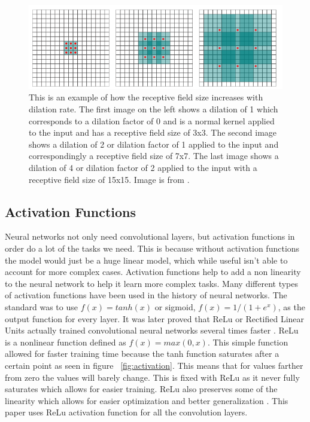 \begin{figure}[tbh]
\centering
\includegraphics[width=\textwidth]{dilated_convolutions.png}
\caption{This is an example of how the receptive field size increases with dilation rate. The first image on the left shows a dilation of 1 which corresponds to a dilation factor of 0 and is a normal kernel applied to the input and has a receptive field size of 3x3. The second image shows a dilation of 2 or dilation factor of 1 applied to the input and correspondingly a receptive field size of 7x7. The last image shows a dilation of 4 or dilation factor of 2 applied to the input with a receptive field size of 15x15. Image is from \cite{Yu2016MultiScaleCA}. }
\label{fig_dil_convolution}
\end{figure}     

\subsection{Activation Functions}    
    Neural networks not only need convolutional layers, but activation functions in order do a lot of the tasks we need.
    This is because without activation functions the model would just be a huge linear model, which while useful isn't able to account for more complex cases.
    Activation functions help to add a non linearity to the neural network to help it learn more complex tasks.
    Many different types of activation functions have been used in the history of neural networks. 
    The standard was to use $f(x) = tanh(x)$  or sigmoid, $f(x) = 1/(1+e^x)$, as the output function for every layer. 
    It was later proved that ReLu or Rectified Linear Units actually trained convolutional neural networks several times faster \cite{NIPS2012_Krizhevsky}. 
    ReLu is a nonlinear function defined as $f(x) = max(0, x)$. 
    This simple function allowed for faster training time because the tanh function saturates after a certain point as seen in figure ~\ref{fig:activation}. 
    This means that for values farther from zero the values will barely change. 
    This is fixed with ReLu as it never fully saturates which allows for easier training. 
    ReLu also preserves some of the linearity which allows for easier optimization and better generalization \cite{Goodfellow-et-al-2016}. 
    This paper uses ReLu activation function for all the convolution layers.


